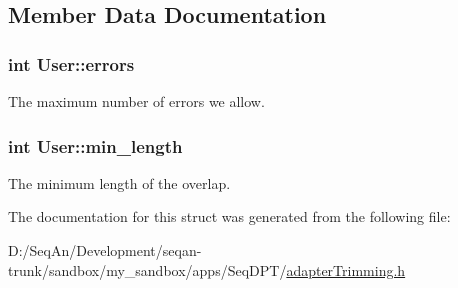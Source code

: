 \subsection{Member Data Documentation}
\hypertarget{struct_user_a8622c0446a3a49852b69c5d558a62d7c}{
\subsubsection[{errors}]{\setlength{\rightskip}{0pt plus 5cm}int User\-::errors}}\label{struct_user_a8622c0446a3a49852b69c5d558a62d7c}
The maximum number of errors we allow. \hypertarget{struct_user_ae94113fb04b477ed27af1e0fe9e7822e}{
\subsubsection[{min\-\_\-length}]{\setlength{\rightskip}{0pt plus 5cm}int User\-::min\-\_\-length}}\label{struct_user_ae94113fb04b477ed27af1e0fe9e7822e}
The minimum length of the overlap. 

The documentation for this struct was generated from the following file\-:\begin{DoxyCompactItemize}
\item 
D\-:/\-Seq\-An/\-Development/seqan-\/trunk/sandbox/my\-\_\-sandbox/apps/\-Seq\-D\-P\-T/\hyperlink{adapter_trimming_8h}{adapter\-Trimming.\-h}\end{DoxyCompactItemize}
